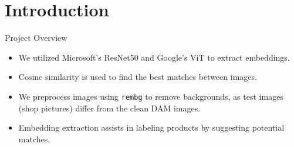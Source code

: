 \documentclass{beamer}
\begin{document}
\section{Introduction}
\begin{frame}{Project Overview}
\begin{itemize}
    \item We utilized Microsoft's ResNet50 and Google's ViT to extract embeddings.
    \item Cosine similarity is used to find the best matches between images.
    \item We preprocess images using \texttt{rembg} to remove backgrounds, as test images (shop pictures) differ from the clean DAM images.
    \item Embedding extraction assists in labeling products by suggesting potential matches.
\end{itemize}
\end{frame}
\end{document}
